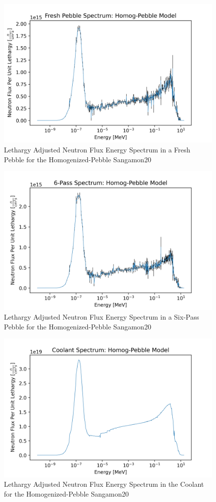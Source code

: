 
\begin{figure}[H]
\centering
  \includegraphics[width=0.95\linewidth]{figures/fresh_spec_homog}
  \caption{Lethargy Adjusted Neutron Flux Energy Spectrum in a Fresh Pebble for the Homogenized-Pebble Sangamon20}
  \label{fig:hom-fresh}
\end{figure}

\begin{figure}[H]
\centering
  \includegraphics[width=0.95\linewidth]{figures/6_spec_homog}
  \caption{Lethargy Adjusted Neutron Flux Energy Spectrum in a Six-Pass Pebble for the Homogenized-Pebble Sangamon20}
  \label{fig:hom-six}
\end{figure}

\begin{figure}[H]
\centering
  \includegraphics[width=0.95\linewidth]{figures/cool_spec_homog}
  \caption{Lethargy Adjusted Neutron Flux Energy Spectrum in the Coolant for the Homogenized-Pebble Sangamon20}
  \label{fig:hom-cool}
\end{figure}
